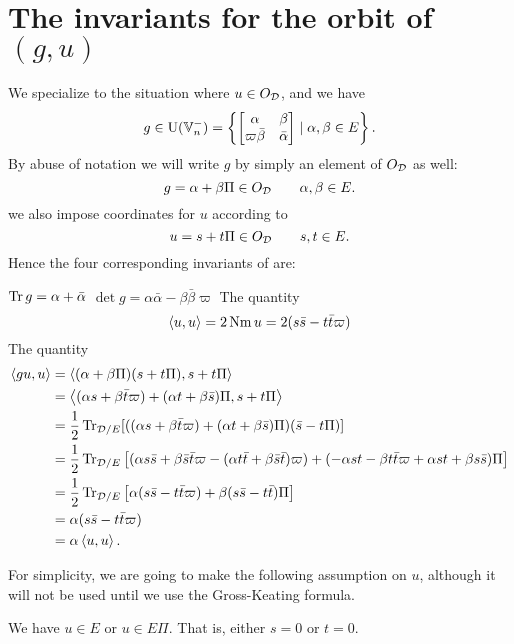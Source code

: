 \section{The invariants for the orbit of $(g,u)$}
\label{sec:g_u_invariants}
We specialize to the situation where $u \in O_\mathcal D$, and we have
\[ g \in \operatorname{U}(\mathbb V_n^-) = \left\{
    \begin{bmatrix} \alpha & \beta \\ \varpi\bar\beta & \bar\alpha \end{bmatrix}
    \mid \alpha, \beta \in E \right\}. \]
By abuse of notation we will write $g$ by simply an element of $O_\mathcal D$ as well:
\[ g = \alpha + \beta \Pi \in O_\mathcal D \qquad \alpha, \beta \in E. \]
we also impose coordinates for $u$ according to
\[ u = s + t \Pi \in O_\mathcal D \qquad s, t \in E. \]
Hence the four corresponding invariants of  are:
\begin{itemize}
  \ii $\operatorname{Tr} g = \alpha + \bar\alpha$
  \ii $\det g = \alpha \bar \alpha - \beta \bar\beta \varpi$
  \ii The quantity
  \[ \left\langle u,u \right\rangle = 2 \operatorname{Nm} u = 2(s \bar s - t \bar t \varpi) \]
  \ii The quantity
  \begin{align*}
    \left\langle gu, u \right\rangle
    &= \left\langle (\alpha + \beta \Pi)(s + t \Pi), s + t \Pi \right\rangle \\
    &= \left\langle (\alpha s + \beta \bar t \varpi) + (\alpha t + \beta \bar s) \Pi,
      s + t \Pi \right\rangle \\
    &= \frac{1}{2} \operatorname{Tr}_{\mathcal D/E} [((\alpha s + \beta \bar t \varpi) + (\alpha t + \beta \bar s) \Pi) (\bar s - t \Pi)] \\
    &= \frac{1}{2} \operatorname{Tr}_{\mathcal D/E} \left[
      (\alpha s \bar s + \beta \bar s \bar t \varpi
      - (\alpha t \bar t + \beta \bar s \bar t) \varpi)
      + (-\alpha s t - \beta t \bar t \varpi + \alpha s t + \beta s \bar s) \Pi
    \right] \\
    &= \frac{1}{2} \operatorname{Tr}_{\mathcal D/E} \left[
      \alpha (s \bar s - t \bar t \varpi)
      + \beta(s \bar s - t \bar t) \Pi \right] \\
    &= \alpha (s \bar s - t \bar t \varpi) \\
    &= \alpha \left\langle u,u \right\rangle.
  \end{align*}
\end{itemize}

For simplicity, we are going to make the following assumption on $u$,
although it will not be used until we use the Gross-Keating formula.
\begin{assume}
  We have $u \in E$ or $u \in E \Pi$.
  That is, either $s = 0$ or $t = 0$.
  \label{assume:st_zero}
\end{assume}

